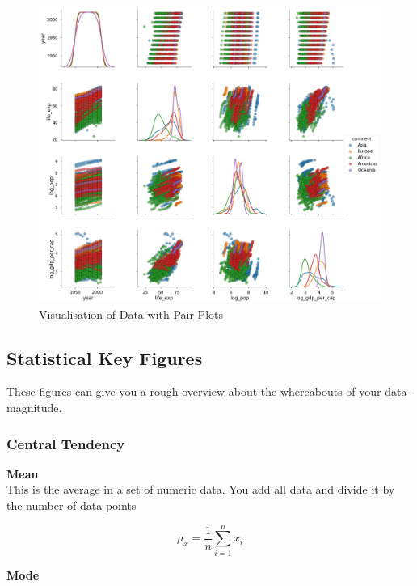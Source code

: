 \documentclass[11pt]{article}
\begin{document}
\begin{figure}[htb!]
    \centering
    \includegraphics[keepaspectratio=true, width=0.4\textheight]{pair_plots.png}
    \caption{Visualisation of Data with Pair Plots}
    \label{fig:pair_plots}
\end{figure}

\newpage

\subsection{Statistical Key Figures}

These figures can give you a rough overview about the whereabouts of your data-magnitude.

\subsubsection{Central Tendency}

\textbf{Mean} \\

This is the average in a set of numeric data. You add all data and divide it by the number of data points

\begin{equation}
    \mu_{x}=\frac{1}{n} \sum^{n}_{i=1} x_{i}
\end{equation}

\vspace{10px}

\noindent \textbf{Mode} \\
\end{document}
